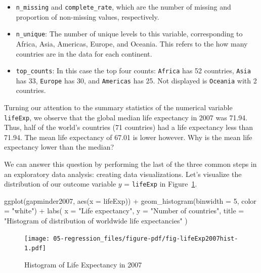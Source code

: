 \documentclass[
  letterpaper,
  DIV=11,
  numbers=noendperiod]{scrreprt}
\newenvironment{Shaded}{\begin{snugshade}}{\end{snugshade}}
\newcommand{\AttributeTok}[1]{\textcolor[rgb]{0.40,0.45,0.13}{#1}}
\newcommand{\DecValTok}[1]{\textcolor[rgb]{0.68,0.00,0.00}{#1}}
\newcommand{\FunctionTok}[1]{\textcolor[rgb]{0.28,0.35,0.67}{#1}}
\newcommand{\NormalTok}[1]{\textcolor[rgb]{0.00,0.23,0.31}{#1}}
\newcommand{\SpecialCharTok}[1]{\textcolor[rgb]{0.37,0.37,0.37}{#1}}
\newcommand{\StringTok}[1]{\textcolor[rgb]{0.13,0.47,0.30}{#1}}
\theoremstyle{definition}
\theoremstyle{remark}
\begin{document}
\begin{itemize}
\item
  \texttt{n\_missing} and \texttt{complete\_rate}, which are the number
  of missing and proportion of non-missing values, respectively.
\item
  \texttt{n\_unique}: The number of unique levels to this variable,
  corresponding to Africa, Asia, Americas, Europe, and Oceania. This
  refers to the how many countries are in the data for each continent.
\item
  \texttt{top\_counts}: In this case the top four counts:
  \texttt{Africa} has 52 countries, \texttt{Asia} has 33,
  \texttt{Europe} has 30, and \texttt{Americas} has 25. Not displayed is
  \texttt{Oceania} with 2 countries.
\end{itemize}

Turning our attention to the summary statistics of the numerical
variable \texttt{lifeExp}, we observe that the global median life
expectancy in 2007 was 71.94. Thus, half of the world's countries (71
countries) had a life expectancy less than 71.94. The mean life
expectancy of 67.01 is lower however. Why is the mean life expectancy
lower than the median?

We can answer this question by performing the last of the three common
steps in an exploratory data analysis: creating data visualizations.
Let's visualize the distribution of our outcome variable \(y\) =
\texttt{lifeExp} in Figure~\ref{fig-lifeExp2007hist}.

\begin{Shaded}
\begin{Highlighting}[]
\FunctionTok{ggplot}\NormalTok{(gapminder2007, }\FunctionTok{aes}\NormalTok{(}\AttributeTok{x =}\NormalTok{ lifeExp)) }\SpecialCharTok{+}
  \FunctionTok{geom\_histogram}\NormalTok{(}\AttributeTok{binwidth =} \DecValTok{5}\NormalTok{, }\AttributeTok{color =} \StringTok{"white"}\NormalTok{) }\SpecialCharTok{+}
  \FunctionTok{labs}\NormalTok{(}
    \AttributeTok{x =} \StringTok{"Life expectancy"}\NormalTok{, }
    \AttributeTok{y =} \StringTok{"Number of countries"}\NormalTok{,}
    \AttributeTok{title =} \StringTok{"Histogram of distribution of worldwide life expectancies"}
\NormalTok{    )}
\end{Highlighting}
\end{Shaded}

\begin{figure}[H]

{\centering \texttt{[image: 05-regression\_files/figure-pdf/fig-lifeExp2007hist-1.pdf]}

}

\caption{\label{fig-lifeExp2007hist}Histogram of Life Expectancy in
2007}

\end{figure}
\end{document}
